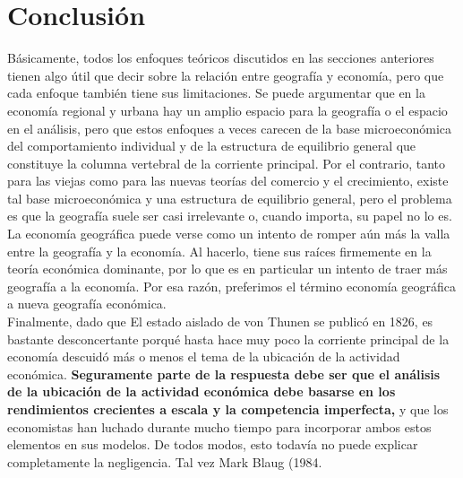 \section{Conclusión}
Básicamente, todos los enfoques teóricos discutidos en las secciones anteriores tienen algo útil que decir sobre la relación entre geografía y economía, pero que cada enfoque también tiene sus limitaciones. Se puede argumentar que en la economía regional y urbana hay un amplio espacio para la geografía o el espacio en el análisis, pero que estos enfoques a veces carecen de la base microeconómica del comportamiento individual y de la estructura de equilibrio general que constituye la columna vertebral de la corriente principal. Por el contrario, tanto para las viejas como para las nuevas teorías del comercio y el crecimiento, existe tal base microeconómica y una estructura de equilibrio general, pero el problema es que la geografía suele ser casi irrelevante o, cuando importa, su papel no lo es. La economía geográfica puede verse como un intento de romper aún más la valla entre la geografía y la economía. Al hacerlo, tiene sus raíces firmemente en la teoría económica dominante, por lo que es en particular un intento de traer más geografía a la economía. Por esa razón, preferimos el término economía geográfica a nueva geografía económica.\\ 
Finalmente, dado que El estado aislado de von Thunen se publicó en 1826, es bastante desconcertante porqué hasta hace muy poco la corriente principal de la economía descuidó más o menos el tema de la ubicación de la actividad económica. \textbf{Seguramente parte de la respuesta debe ser que el análisis de la ubicación de la actividad económica debe basarse en los rendimientos crecientes a escala y la competencia imperfecta,} y que los economistas han luchado durante mucho tiempo para incorporar ambos estos elementos en sus modelos. De todos modos, esto todavía no puede explicar completamente la negligencia. Tal vez Mark Blaug (1984.

